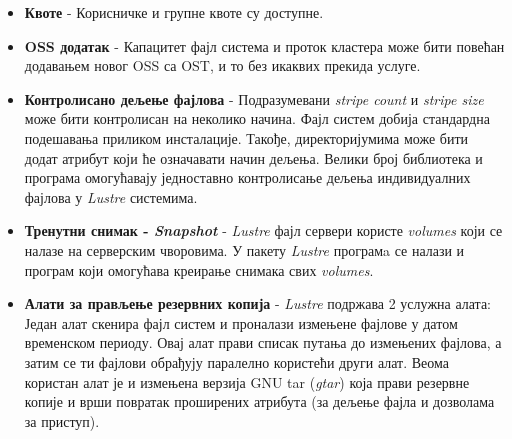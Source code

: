\begin{itemize}
\item  \textbf{Квоте} - Корисничке и групне квоте су доступне.

\item \textbf{OSS додатак} - Капацитет фајл система и проток кластера може бити повећан додавањем новог OSS са OST, и то без икаквих прекида услуге.

\item  \textbf{Контролисано дељење фајлова} - Подразумевани \textit{stripe count} и \textit{stripe size} може бити контролисан на неколико начина. Фајл систем добија стандардна подешавања приликом инсталације. Такође, директоријумима може бити додат атрибут који ће означавати начин дељења. Велики број библиотека и програма омогућавају једноставно контролисање дељења индивидуалних фајлова у   \textit{Lustre} системима.

\item  \textbf{Тренутни снимак - \textit{Snapshot}} -   \textit{Lustre}  фајл сервери користе \textit{volumes} који се налазе на серверским чворовима. У пакету   \textit{Lustre} програмa  се налази и програм који омогућава креирање  снимака свих \textit{volumes}.

\item \textbf{Алати за прављење резервних копија} -   \textit{Lustre}  подржава 2 услужна алата: Један алат скенира фајл систем и проналази измењене фајлове у датом временском периоду. Овај алат прави списак путања до измењених фајлова, а затим се ти фајлови обрађују паралелно користећи други алат. Веома  користан алат је и измењена верзија GNU tar (\textit{gtar}) која прави резервне копије и врши повратак проширених атрибута (за дељење фајла и дозволама за приступ). 
\end{itemize}

